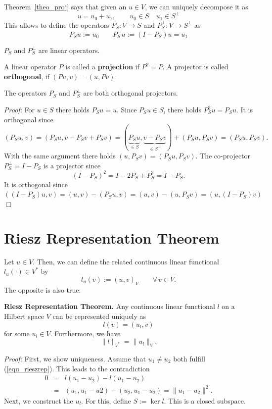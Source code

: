 \bigskip
Theorem~\ref{theo_proj} says that given an $u \in V$, we can uniquely
decompose it as
$$
u = u_0 + u_1, \qquad u_0 \in S \quad u_1 \in S^\bot
$$
This allows to define the operators $P_S : V \rightarrow S$ and $P_S^\bot : V \rightarrow S^\bot$ as 
$$
P_S u := u_0 \qquad P_S^\bot u := (I - P_S) u = u_1
$$

\begin{theorem} $P_S$ and $P_S^\bot$ are linear operators. 
\end{theorem}

\begin{definition} A linear operator $P$ is called a {\bf projection} if $P^2 = P$.
A projector is called {\bf orthogonal}, if $(Pu,v) = (u,Pv)$.
\end{definition}
\begin{lemma} The operators $P_S$ and $P_S^\bot$ are both orthogonal 
projectors.
\end{lemma}
\noindent
{\em Proof:} For $u \in S$ there holds $P_S u = u$. Since $P_S u \in S$, there holds $P_S^2 u = P_S u$. It is orthogonal since
$$
(P_Su,v) = (P_Su,v-P_Sv+P_Sv) = (\underbrace{P_S u}_{\in S}, \underbrace{v-P_Sv}_{\in S^\bot}) + (P_Su,P_Sv) = (P_Su,P_Sv).
$$
With the same argument there holds $(u,P_Sv) = (P_Su,P_Sv)$.
The co-projector $P_S^\bot = I - P_S$ is a projector since
$$
(I-P_S)^2 = I - 2 P_S + P_S^2 = I - P_S.
$$
It is orthogonal since $((I-P_S) u,v) = (u,v)-(P_Su,v) =
        (u,v)-(u,P_Sv) = (u,(I-P_S)v)$
\hfill $\Box$

\section{Riesz Representation Theorem}
Let $u \in V$. Then, we can define the related continuous linear
functional~$l_u(\cdot) \in V^\ast$ by
$$
l_u (v) := (u,v)_V \qquad \forall \, v \in V.
$$
The opposite is also true:
\begin{theorem} {\bf Riesz Representation Theorem.} Any continuous linear
functional $l$ on a Hilbert space $V$ can be represented uniquely as
\begin{equation}
\label{equ_rieszrep}
l(v) = (u_l,v)
\end{equation}
for some $u_l \in V$. Furthermore, we have
$$
\| l \|_{V^\ast} = \| u_l \|_V.
$$
\end{theorem}
\noindent
{\em Proof:} First, we show uniqueness. Assume that $u_1 \neq u_2$ both
fulfill (\ref{equ_rieszrep}). This leads to the contradiction
\begin{eqnarray*}
0 & = & l(u_1-u_2) - l(u_1-u_2) \\
  & = & (u_1,u_1-u2) - (u_2,u_1-u_2) = \| u_1 - u_2 \|^2.
\end{eqnarray*}
Next, we construct the $u_l$. For this, define 
$S := \operatorname{ker} l$. This is a closed subspace. 


